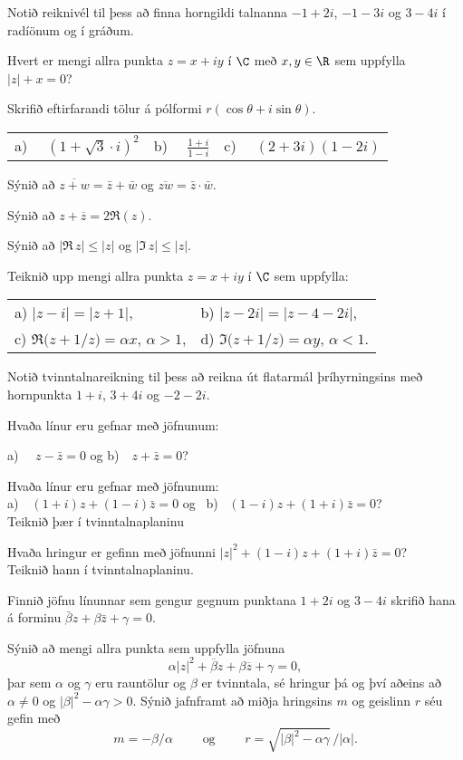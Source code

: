 \daemi Notið reiknivél til þess að finna horngildi talnanna
$-1+2i$, $-1-3i$ og  $3-4i$ í radíönum og í gráðum.

\daemi Hvert er mengi allra punkta $z=x+iy$ í $\C$ með $x,y\in \R$
sem uppfylla $|z|+x=0$?


\daemi Skrifið eftirfarandi tölur á pólformi $r(\cos \theta+i\sin
\theta)$. 

\smallskip
\begin{tabular}{lll}
a) \ \  $(1+\sqrt{3}\cdot i)^2$ &
b) \ \  $\frac{1+i}{1-i}$ &
c) \ \ $(2+3i)(1-2i)$ \\
\end{tabular}

\daemi Sýnið að $\overline {z+w}=\bar z+\bar w$ og
$\overline{zw}=\bar z\cdot \bar w$.

\daemi Sýnið að $z + \overline z = 2\Re(z)$.

\daemi Sýnið að $|\Re\, z|\leq|z|$ og $|\Im\, z|\leq|z|$.

\daemi Teiknið upp mengi allra punkta $z=x+iy$ í $\C$ sem uppfylla:

\smallskip
\begin{tabular}{ll}
a)  $|z-i|=|z+1|$,
&b) $|z-2i|=|z-4-2i|$,\\
c) $\Re\big(z+1/z\big)={\alpha}x$, ${\alpha}>1$,
&d) $\Im\big(z+1/z\big)={\alpha} y$, ${\alpha}<1$.\\ 
\end{tabular}

\daemi Notið tvinntalnareikning til þess að reikna út flatarmál 
þríhyrningsins með hornpunkta $1+i$, $3+4i$ og $-2-2i$.

\daemi Hvaða línur eru gefnar með jöfnunum: 

a) \ \ $z-\bar z=0$ og   b)\ \ $z+\bar z=0$?

\daemi  Hvaða línur eru gefnar með jöfnunum:
\\
a)\ \ $(1+i)z+(1-i)\bar z=0$  og \ b) \ $(1-i)z+(1+i)\bar z=0$?  
\\
Teiknið þær í tvinntalnaplaninu

\daemi   Hvaða hringur er gefinn með jöfnunni 
$|z|^2+(1-i)z+(1+i)\bar z=0$? \\ Teiknið hann í tvinntalnaplaninu.

\daemi Finnið jöfnu línunnar sem gengur gegnum punktana $1+2i$ 
og  $3-4i$ skrifið hana á forminu $\bar \beta z+\beta\bar z+\gamma=0$.

\daemi Sýnið að mengi allra punkta sem uppfylla jöfnuna
 \begin{equation*}\alpha|z|^2+\overline \beta z+\beta\overline z +\gamma=0,
 \end{equation*}
þar sem $\alpha$ og $\gamma$ eru rauntölur og $\beta$ er tvinntala,
sé hringur þá og því aðeins að $\alpha\neq 0$ og 
$|\beta|^2-{\alpha}\gamma>0$.   Sýnið jafnframt að miðja hringsins
$m$ og 
geislinn  $r$ séu gefin með
$$m=-\beta/\alpha\qquad \text{ og } \qquad
r=\sqrt{|\beta|^2-\alpha\gamma}\, /|\alpha|.
$$

